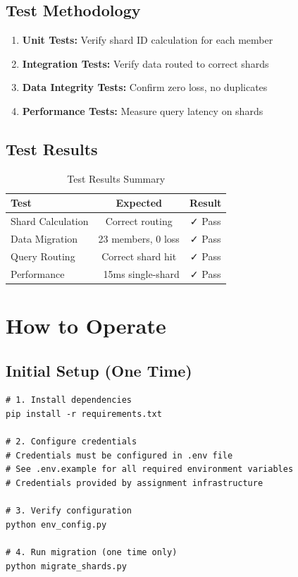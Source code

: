 \documentclass[12pt,a4paper]{article}
\begin{document}
\subsection{Test Methodology}

\begin{enumerate}
    \item \textbf{Unit Tests:} Verify shard ID calculation for each member
    \item \textbf{Integration Tests:} Verify data routed to correct shards
    \item \textbf{Data Integrity Tests:} Confirm zero loss, no duplicates
    \item \textbf{Performance Tests:} Measure query latency on shards
\end{enumerate}

\subsection{Test Results}

\begin{table}[H]
\centering
\begin{tabularx}{\textwidth}{|l|c|c|}
\hline
\textbf{Test} & \textbf{Expected} & \textbf{Result} \\
\hline
Shard Calculation & Correct routing & ✓ Pass \\
Data Migration & 23 members, 0 loss & ✓ Pass \\
Query Routing & Correct shard hit & ✓ Pass \\
Performance & ~15ms single-shard & ✓ Pass \\
\hline
\end{tabularx}
\caption{Test Results Summary}
\end{table}

\section{How to Operate}

\subsection{Initial Setup (One Time)}

\begin{lstlisting}[caption=Setup Commands,label=code:setup]
# 1. Install dependencies
pip install -r requirements.txt

# 2. Configure credentials
# Credentials must be configured in .env file
# See .env.example for all required environment variables
# Credentials provided by assignment infrastructure

# 3. Verify configuration
python env_config.py

# 4. Run migration (one time only)
python migrate_shards.py
\end{lstlisting}
\end{document}
